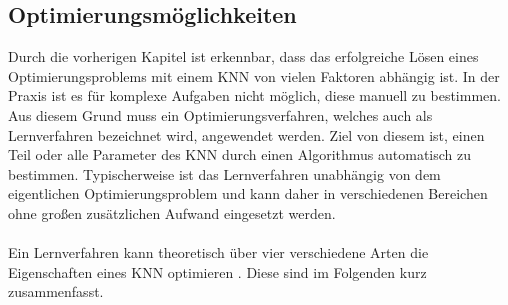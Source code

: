 \subsection{Optimierungsmöglichkeiten}
\label{subsec:optimization_strategies}
Durch die vorherigen Kapitel ist erkennbar, dass das erfolgreiche Lösen eines Optimierungsproblems mit einem \ac{KNN} von vielen Faktoren abhängig ist. In der Praxis ist es für komplexe Aufgaben nicht möglich, diese manuell zu bestimmen. Aus diesem Grund muss ein Optimierungsverfahren, welches auch als Lernverfahren bezeichnet wird, angewendet werden. Ziel von diesem ist, einen Teil oder alle Parameter des \ac{KNN} durch einen Algorithmus automatisch zu bestimmen. Typischerweise ist das Lernverfahren unabhängig von dem eigentlichen Optimierungsproblem und kann daher in verschiedenen Bereichen ohne großen zusätzlichen Aufwand eingesetzt werden.\\\\
Ein Lernverfahren kann theoretisch über vier verschiedene Arten die Eigenschaften eines \ac{KNN} optimieren \cite{zell2003simulation}. Diese sind im Folgenden kurz zusammenfasst.

